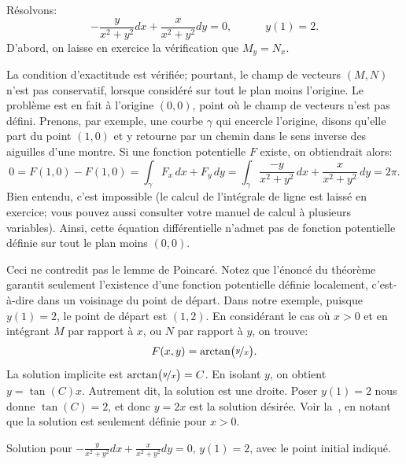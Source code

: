 \begin{example}
	Résolvons:
	\begin{equation*}
		-\frac{y}{x^2+y^2} dx + \frac{x}{x^2+y^2} dy = 0, \quad  \qquad y(1) = 2.
	\end{equation*}
	D'abord, on laisse en exercice la vérification que 	$M_y = N_x$.

	La condition d'exactitude est vérifiée; pourtant, le champ de vecteurs $(M,N)$ n'est pas conservatif,
	lorsque considéré sur tout le plan moins l'origine.
	Le problème est en fait à l'origine $(0,0)$, point où le champ de vecteurs n'est pas défini.
	Prenons, par exemple, une courbe $\gamma$ qui encercle l'origine, disons qu'elle part du point $(1,0)$
	et y retourne par un chemin dans le sens inverse des aiguilles d'une montre. 
	Si une fonction potentielle $F$ existe, on obtiendrait alors:
	\begin{equation*}
		0 = F(1,0) - F(1,0) = \int_\gamma F_x \, dx + F_y \, dy
							= \int_\gamma \frac{-y}{x^2+y^2} \, dx + \frac{x}{x^2+y^2} \, dy = 2\pi .
	\end{equation*}
	Bien entendu, c'est impossible (le calcul de l'intégrale de ligne est laissé  en exercice; vous pouvez aussi consulter votre manuel de calcul à plusieurs variables). 
	Ainsi, cette équation différentielle n'admet pas de fonction potentielle définie sur tout le plan moins $(0,0)$.

	Ceci ne contredit pas le lemme de Poincaré.
	Notez que l'énoncé du théorème garantit seulement l'existence d'une fonction potentielle définie localement,
	c'est-à-dire dans un voisinage du point de départ.   Dans notre exemple, puisque $y(1) = 2$, le point de départ est $(1,2)$.
	En considérant le cas où $x > 0$ et en intégrant $M$ par rapport à $x$, ou $N$ par rapport à $y$, on trouve:
	\begin{equation*}
		F(x,y) = \operatorname{arctan} \bigl( \nicefrac{y}{x} \bigr) .
	\end{equation*}
	La solution implicite est
	$\operatorname{arctan} \bigl( \nicefrac{y}{x} \bigr) = C$. 
	En isolant $y$, on obtient
	$y = \tan(C) x$.  Autrement dit, la solution est une droite.  
	Poser $y(1) = 2$ nous donne $\tan(C) = 2$, et donc $y= 2x$ est la solution désirée.
	Voir la~, en notant que la solution est seulement définie pour $x >
	0$.
	\begin{myfig}
		\capstart	{}
		\caption{Solution pour
		$-\frac{y}{x^2+y^2} dx + \frac{x}{x^2+y^2} dy = 0$, $y(1) = 2$,
		avec le point initial indiqué.\label{exact:y2x}}
	\end{myfig}
\end{example}

